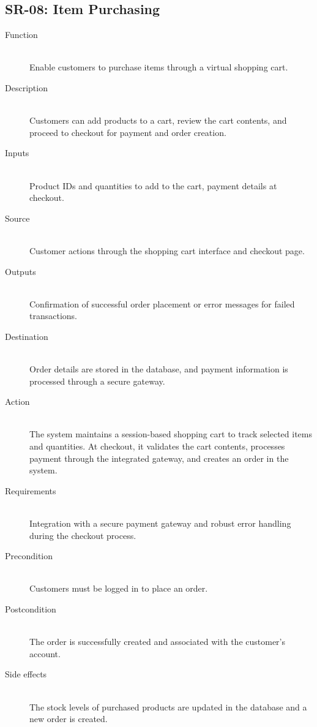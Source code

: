 \documentclass[a4paper,journal]{IEEEtran}
\begin{document}
\subsection{SR-08: Item Purchasing}
\begin{description}
  \item[Function] \hfill \\
  Enable customers to
  purchase items through a virtual shopping cart.
  \item[Description] \hfill \\
  Customers can add products to a cart, review the cart
  contents, and proceed to checkout for payment and order creation.
  \item[Inputs] \hfill \\
  Product IDs and quantities to add to the cart, payment
  details at checkout.
  \item[Source] \hfill \\
  Customer actions through the shopping cart interface
  and checkout page.
  \item[Outputs] \hfill \\
  Confirmation of successful order placement or error
  messages for failed transactions.
  \item[Destination] \hfill \\
  Order details are stored in the database, and payment
  information is processed through a secure gateway.
  \item[Action] \hfill \\
  The system maintains a session-based shopping cart to
  track selected items and quantities. At checkout, it validates the cart
  contents, processes payment through the integrated gateway, and creates an
  order in the system.
  \item[Requirements] \hfill \\
  Integration with a secure payment gateway and robust
  error handling during the checkout process.
  \item[Precondition] \hfill \\
  Customers must be logged in to place an order.
  \item[Postcondition] \hfill \\
  The order is successfully created and associated with
  the customer's account.
  \item[Side effects] \hfill \\
  The stock levels of purchased products are updated in
  the database and a new order is created.
\end{description}
\end{document}
